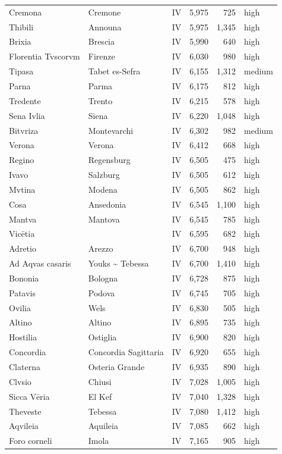 \documentclass[11pt,a4paper]{article}
\begin{document}
{\begin{longtable}{p{4.6cm}p{5.2cm}lrrl}
Cremona & Cremone & IV & 5,975 & 725 & high\\
Thibili & Announa & IV & 5,975 & 1,345 & high\\
Brixia & Brescia & IV & 5,990 & 640 & high\\
Florentia Tvscorvm & Firenze & IV & 6,030 & 980 & high\\
Tipasa & Tabet es-Sefra & IV & 6,155 & 1,312 & medium\\
Parna & Parma & IV & 6,175 & 812 & high\\
Tredente & Trento & IV & 6,215 & 578 & high\\
Sena Ivlia & Siena & IV & 6,220 & 1,048 & high\\
Bitvriza & Montevarchi & IV & 6,302 & 982 & medium\\
Verona & Verona & IV & 6,412 & 668 & high\\
Regino & Regensburg & IV & 6,505 & 475 & high\\
Ivavo & Salzburg & IV & 6,505 & 612 & high\\
Mvtina & Modena & IV & 6,505 & 862 & high\\
Cosa & Ansedonia & IV & 6,545 & 1,100 & high\\
Mantva & Mantova & IV & 6,545 & 785 & high\\
Vicētia &  & IV & 6,595 & 682 & high\\
Adretio & Arezzo & IV & 6,700 & 948 & high\\
Ad Aqvas casaris & Youks \textasciitilde{} Tebessa & IV & 6,700 & 1,410 & high\\
Bononia & Bologna & IV & 6,728 & 875 & high\\
Patavis & Podova & IV & 6,745 & 705 & high\\
Ovilia & Wels & IV & 6,830 & 505 & high\\
Altino & Altino & IV & 6,895 & 735 & high\\
Hostilia & Ostiglia & IV & 6,900 & 820 & high\\
Concordia & Concordia Sagittaria & IV & 6,920 & 655 & high\\
Claterna & Osteria Grande & IV & 6,935 & 890 & high\\
Clvsio & Chiusi & IV & 7,028 & 1,005 & high\\
Sicca Vēria & El Kef & IV & 7,040 & 1,328 & high\\
Theveste & Tebessa & IV & 7,080 & 1,412 & high\\
Aqvileia & Aquileia & IV & 7,085 & 662 & high\\
Foro corneli & Imola & IV & 7,165 & 905 & high\\

\end{longtable}}
\end{document}
